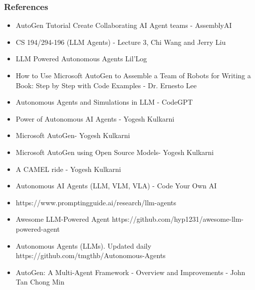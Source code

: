 \begin{frame}[fragile]\frametitle{References}
\begin{itemize}
\item AutoGen Tutorial Create Collaborating AI Agent teams - AssemblyAI
\item CS 194/294-196 (LLM Agents) - Lecture 3, Chi Wang and Jerry Liu
\item LLM Powered Autonomous Agents Lil'Log
\item How to Use Microsoft AutoGen to Assemble a Team of Robots for Writing a Book: Step by Step with Code Examples - Dr. Ernesto Lee
\item Autonomous Agents and Simulations in LLM - CodeGPT
\item Power of Autonomous AI Agents - Yogesh Kulkarni
\item Microsoft AutoGen- Yogesh Kulkarni
\item Microsoft AutoGen using Open Source Models- Yogesh Kulkarni
\item A CAMEL ride - Yogesh Kulkarni
\item Autonomous AI Agents (LLM, VLM, VLA) - Code Your Own AI
\item https://www.promptingguide.ai/research/llm-agents
\item Awesome LLM-Powered Agent https://github.com/hyp1231/awesome-llm-powered-agent
\item Autonomous Agents (LLMs). Updated daily https://github.com/tmgthb/Autonomous-Agents
\item AutoGen: A Multi-Agent Framework - Overview and Improvements - John Tan Chong Min
\end{itemize}
\end{frame}